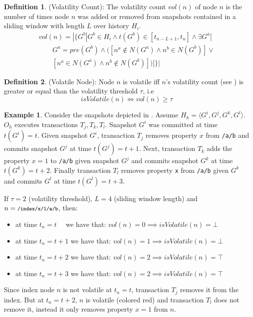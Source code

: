 \documentclass[abstracton,12pt]{scrartcl}
\theoremstyle{definition}
\newtheorem{definition}{Definition}
\newtheorem{example}{Example}
\begin{document}
\begin{definition}
    (Volatility Count): The volatility count $vol(n)$ of node $n$ is the number of times node $n$ was added or removed from snapshots contained in a sliding window with length $L$ over history $H_i$.
    \begin{equation}
        \begin{split}
            vol(n) = | \{ G^b | G^b \in H_i \land t(G^b) \in [t_{n-L+1}, t_n] \land \exists G^a[ \\
            \qquad G^a = pre(G^b) \land ([n^a \notin N(G^a) \land n^b \in N(G^b)]\lor \\
            \qquad [n^a \in N(G^a) \land n^b \notin N(G^b)] )]\} |
        \end{split}
    \end{equation}
    \label{def:vol_count}
\end{definition}

\begin{definition}
    (Volatile Node): Node $n$ is volatile iff $n$'s volatility count (see ) is greater or equal than the volatility threshold $\tau$, i.e 
    $$ isVolatile(n) \iff vol(n) \geq \tau $$
\end{definition}

\begin{example}
    Consider the snapshots depicted in .
    Assume $H_h = \langle G^i,G^j,G^k,G^l \rangle$.
    $O_h$ executes transactions $T_j, T_k, T_l$. Snapshot $G^i$ was committed at time $t(G^i) = t$.
    Given snapshot $G^i$, transaction $T_j$ removes property $x$ from \texttt{/a/b} and commits snapshot $G^j$ at time $t(G^j) = t + 1$.
    Next, transaction $T_k$ adds the property $x=1$ to \texttt{/a/b} given snapshot $G^j$ and commits snapshot $G^k$ at time $t(G^k) = t + 2$.
    Finally transaction $T_l$ removes property \texttt{x} from \texttt{/a/b} given $G^k$ and commits $G^l$ at time $t(G^l) = t + 3$.

    If $\tau = 2$ (volatility threshold), $L = 4$ (sliding window length) and $n = \texttt{\footnotesize /index/x/1/a/b}$, then:
    \begin{itemize}
        \item at time $t_n = t$ \quad \ \ we have that: \quad $vol(n) = 0 \implies isVolatile(n) = \bot$
        \item at time $t_n = t + 1 $ we have that: \quad $ vol(n) = 1  \implies isVolatile(n) = \bot$
        \item at time $t_n = t + 2 $ we have that: \quad $ vol(n) = 2  \implies isVolatile(n) = \top$
        \item at time $t_n = t + 3 $ we have that: \quad $ vol(n) = 2  \implies isVolatile(n) = \top$
    \end{itemize}
    
    Since index node $n$ is not volatile at $t_n = t$, transaction $T_j$ removes it from the index.
    But at $t_n = t + 2$, $n$ is volatile (colored red) and transaction $T_l$ does not remove it, instead it only removes property $x=1$ from $n$.
\end{example}
\end{document}
